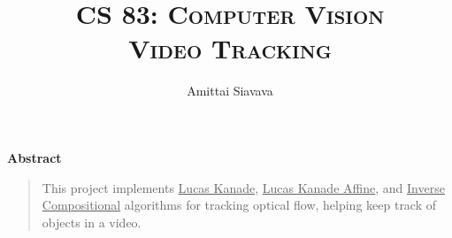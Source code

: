 \title{
  \Huge{\textsc{CS 83: Computer Vision}}\\
  \textsc{Video Tracking}
}

\date{\Large{}}

\begin{titlingpage}

  \author{\Large{Amittai Siavava}}
  \maketitle

  \begin{center} \textbf{Abstract} \end{center}

  
  \begin{quote}
    \small
    
    This project implements \underline{Lucas Kanade},
    \underline{Lucas Kanade Affine}, and \underline{Inverse Compositional}
    algorithms for tracking optical flow, helping keep track of objects
    in a video.

  \end{quote}

  \tableofcontents
  
\end{titlingpage}
